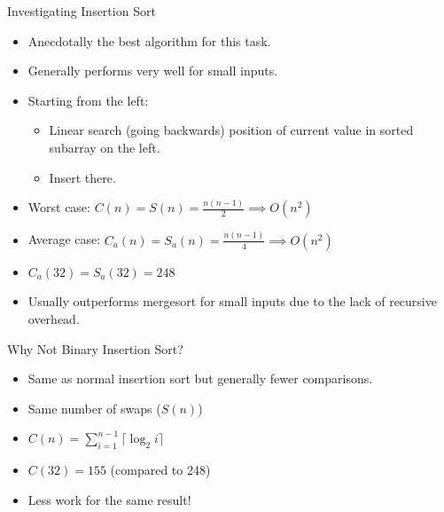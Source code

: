 \documentclass[13pt]{beamer}
\begin{document}
\begin{frame}{Investigating Insertion Sort}
	\begin{itemize}
		\item\pause Anecdotally the best algorithm for this task.
		\item\pause Generally performs very well for small inputs.
		\item\pause Starting from the left:
		\begin{itemize}
			\item Linear search (going backwards) position of current value in sorted subarray on the left.
			\item Insert there.
		\end{itemize}
		\item\pause Worst case: $C(n) = S(n) = \frac{n(n - 1)}{2} \implies O(n^{2})$
		\item\pause Average case: $C_{a}(n) = S_{a}(n) = \frac{n(n - 1)}{4} \implies O(n^{2})$
		\item\pause $C_{a}(32) = S_{a}(32) = 248$
		\item\pause Usually outperforms mergesort for small inputs due to the lack
		of recursive overhead.
	\end{itemize}
\end{frame}

\begin{frame}
	\centering
\end{frame}

\begin{frame}{Why Not Binary Insertion Sort?}
	\pause
	\begin{itemize}[<+->]
		\item Same as normal insertion sort but generally fewer comparisons.
		\item Same number of swaps ($S(n)$)
		\item $C(n) = \sum_{i = 1}^{n - 1}{\lceil \log_{2}{i} \rceil}$
		\item $C(32) = 155$ (compared to 248)
		\item Less work for the same result!
	\end{itemize}
\end{frame}
\end{document}
